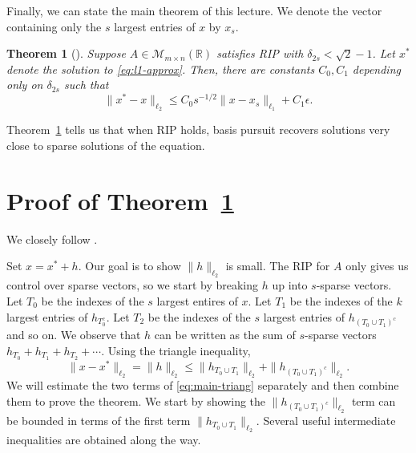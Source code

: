 \documentclass{article}
\newtheorem{theorem}{Theorem}[section]
\theoremstyle{definition}
\begin{document}
Finally, we can state the main theorem of this lecture. We denote the vector containing only the $s$ largest entries of $x$ by $x_s$.
\begin{theorem}[{\cite[1.3]{candes-rip}}]\label{thm:noisy-recovery}
Suppose $A \in \mathcal{M}_{m\times n}(\mathbb{R})$ satisfies RIP with $\delta_{2s} < \sqrt{2} - 1$. Let $x^*$ denote the solution to \eqref{eq:l1-approx}. Then, there are constants $C_0, C_1$ depending only on $\delta_{2s}$ such that $$\|x^* - x\|_{\ell_2} \leq C_0s^{-1/2}\|x - x_s\|_{\ell_1} + C_1\epsilon.$$
\end{theorem}

Theorem~\ref{thm:noisy-recovery} tells us that when RIP holds, basis pursuit recovers solutions very close to sparse solutions of the equation.

\section{Proof of Theorem~\ref{thm:noisy-recovery}}
We closely follow \cite{candes-rip}.

Set $x = x^* + h$. Our goal is to show $\|h\|_{\ell_2}$ is small. The RIP for $A$ only gives us control over sparse vectors, so we start by breaking $h$ up into $s$-sparse vectors. Let $T_0$ be the indexes of the $s$ largest entires of $x$. Let $T_1$ be the indexes of the $k$ largest entries of $h_{T_0^c}$. Let $T_2$ be the indexes of the $s$ largest entries of $h_{(T_0\cup T_1)^c}$ and so on. We observe that $h$ can be written as the sum of $s$-sparse vectors $h_{T_0} + h_{T_1} + h_{T_2} + \dotsb$. Using the triangle inequality,
\begin{equation}\label{eq:main-triang}
\|x - x^*\|_{\ell_2} = \|h\|_{\ell_2} \leq \|h_{T_0\cup T_1}\|_{\ell_2} + \|h_{(T_0\cup T_1)^c}\|_{\ell_2}.
\end{equation}
We will estimate the two terms of \eqref{eq:main-triang} separately and then combine them to prove the theorem. We start by showing the $\|h_{(T_0\cup T_1)^c}\|_{\ell_2}$ term can be bounded in terms of the first term $\|h_{T_0\cup T_1}\|_{\ell_2}$. Several useful intermediate inequalities are obtained along the way.
\end{document}
